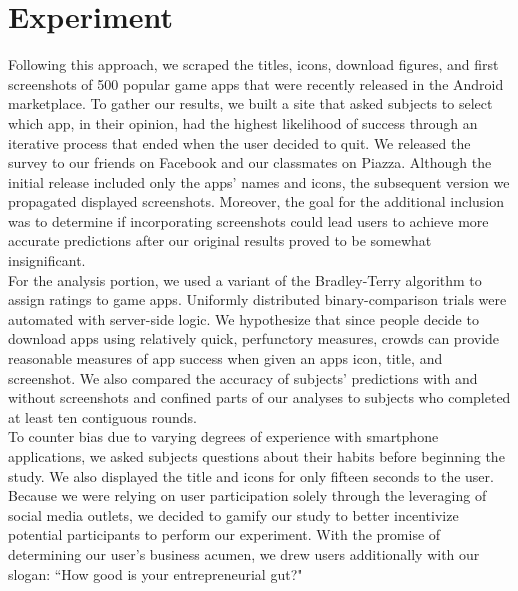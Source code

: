 \section{Experiment}


Following this approach, we scraped the titles, icons, download figures, and first screenshots of 500 popular game apps that were recently released in the Android marketplace.  To gather our results, we built a site that asked subjects to select which app, in their opinion, had the highest likelihood of success through an iterative process that ended when the user decided to quit.  We released the survey to our friends on Facebook and our classmates on Piazza. Although the initial release included only the apps' names and icons, the subsequent version we propagated displayed screenshots. Moreover, the goal for the additional inclusion was to determine if incorporating screenshots could lead users to achieve more accurate predictions after our original results proved to be somewhat insignificant.  \\

For the analysis portion, we used a variant of the Bradley-Terry algorithm to assign ratings to game apps. Uniformly distributed binary-comparison trials were automated with server-side logic. We hypothesize that since people decide to download apps using relatively quick, perfunctory measures, crowds can provide reasonable measures of app success when given an apps icon, title, and screenshot. We also compared the accuracy of subjects' predictions with and without screenshots and confined parts of our analyses to subjects who completed at least ten contiguous rounds.\\

To counter bias due to varying degrees of experience with smartphone applications, we asked subjects questions about their habits before beginning the study. We also displayed the title and icons for only fifteen seconds to the user. Because we were relying on user participation solely through the leveraging of social media outlets, we decided to gamify our study to better incentivize potential participants to perform our experiment. With the promise of determining our user's business acumen, we drew users additionally with our slogan: “How good is your entrepreneurial gut?"\\

